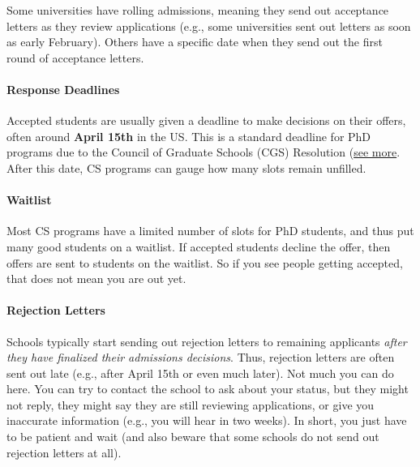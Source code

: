 \documentclass[oneside,11pt,dvipsnames]{book}
\begin{document}
Some universities have rolling admissions, meaning they send out acceptance letters as they review applications (e.g., some universities sent out letters as soon as early February). Others have a specific date when they send out the first round of acceptance letters.   

\paragraph{Response Deadlines} Accepted students are usually given a deadline to make decisions on their offers, often around \textbf{April 15th} in the US. This is a standard deadline for PhD programs due to the Council of Graduate Schools (CGS) Resolution (\href{https://cgsnet.org/wp-content/uploads/2024/01/CGS_April15_Resolution_Jan312024.pdf}{see more}. After this date, CS programs can gauge how many slots remain unfilled.

\paragraph{Waitlist} Most CS programs have a limited number of slots for PhD students, and thus put many good students on a waitlist.  If accepted students decline the offer, then offers are sent to students on the waitlist. So if you see people getting accepted, that does not mean you are out yet.

\paragraph{Rejection Letters} Schools typically start sending out rejection letters to remaining applicants \emph{after they have finalized their admissions decisions}. Thus, rejection letters are often sent out late (e.g., after April 15th or even much later). Not much you can do here. You can try to contact the school to ask about your status, but they might not reply, they might say they are still reviewing applications, or give you inaccurate information (e.g., you will hear in two weeks). In short, you just have to be patient and wait (and also beware that some schools do not send out rejection letters at all).



\end{document}
